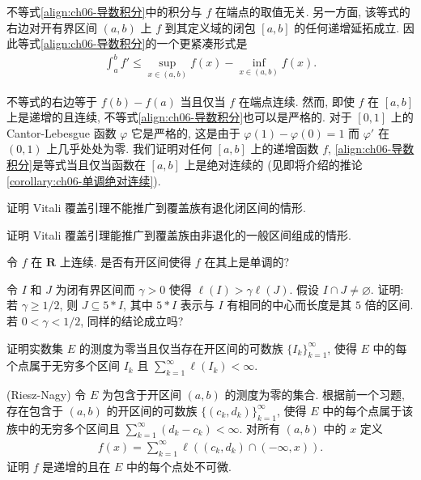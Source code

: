 \documentclass[../../main.tex]{subfiles}
\begin{document}
不等式\eqref{align:ch06-导数积分}中的积分与 $f$ 在端点的取值无关. 另一方面, 该等式的右边对开有界区间 $(a,b)$ 上 $f$ 到其定义域的闭包 $[a,b]$ 的任何递增延拓成立. 因此等式\eqref{align:ch06-导数积分}的一个更紧凑形式是
\begin{align}
\int_{a}^{b}f'\leqslant\sup_{x\in(a,b)}f(x)-\inf_{x\in(a,b)}f(x).\label{align:ch06-紧凑不等式}
\end{align}

不等式的右边等于 $f(b)-f(a)$ 当且仅当 $f$ 在端点连续. 然而, 即使 $f$ 在 $[a,b]$ 上是递增的且连续, 不等式\eqref{align:ch06-导数积分}也可以是严格的. 对于 $[0,1]$ 上的 Cantor-Lebesgue 函数 $\varphi$ 它是严格的, 这是由于 $\varphi(1)-\varphi(0)=1$ 而 $\varphi'$ 在 $(0,1)$ 上几乎处处为零. 我们证明对任何 $[a,b]$ 上的递增函数 $f$, \eqref{align:ch06-导数积分}是等式当且仅当函数在 $[a,b]$ 上是绝对连续的 (见即将介绍的推论\cref{corollary:ch06-单调绝对连续}).

\begin{exercise}\label{exercise:ch06-05}
证明 Vitali 覆盖引理不能推广到覆盖族有退化闭区间的情形.
\end{exercise}

\begin{exercise}\label{exercise:ch06-06}
证明 Vitali 覆盖引理能推广到覆盖族由非退化的一般区间组成的情形.
\end{exercise}

\begin{exercise}\label{exercise:ch06-07}
令 $f$ 在 $\mathbf{R}$ 上连续. 是否有开区间使得 $f$ 在其上是单调的?
\end{exercise}

\begin{exercise}\label{exercise:ch06-08}
令 $I$ 和 $J$ 为闭有界区间而 $\gamma>0$ 使得 $\ell(I)>\gamma\ell(J)$. 假设 $I\cap J\neq\varnothing$. 证明: 若 $\gamma\geqslant 1/2$, 则 $J\subseteq 5*I$, 其中 $5*I$ 表示与 $I$ 有相同的中心而长度是其 $5$ 倍的区间. 若 $0<\gamma<1/2$, 同样的结论成立吗?
\end{exercise}

\begin{exercise}\label{exercise:ch06-09}
证明实数集 $E$ 的测度为零当且仅当存在开区间的可数族 $\{I_{k}\}_{k=1}^{\infty}$, 使得 $E$ 中的每个点属于无穷多个区间 $I_{k}$ 且 $\sum_{k=1}^{\infty}\ell(I_{k})<\infty$.
\end{exercise}

\begin{exercise}\label{exercise:ch06-10}
(Riesz-Nagy) 令 $E$ 为包含于开区间 $(a,b)$ 的测度为零的集合. 根据前一个习题, 存在包含于 $(a,b)$ 的开区间的可数族 $\{(c_{k},d_{k})\}_{k=1}^{\infty}$, 使得 $E$ 中的每个点属于该族中的无穷多个区间且 $\sum_{k=1}^{\infty}(d_{k}-c_{k})<\infty$. 对所有 $(a,b)$ 中的 $x$ 定义
\begin{align*}
f(x)=\sum_{k=1}^{\infty}\ell((c_{k},d_{k})\cap(-\infty,x)).
\end{align*}
证明 $f$ 是递增的且在 $E$ 中的每个点处不可微.
\end{exercise}
\end{document}
